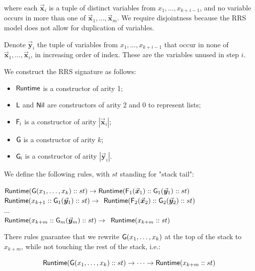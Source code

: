 \documentclass[11pt]{article}
\begin{document}
\noindent where each $\vec{\bm{x}}_i$ is a tuple of distinct variables from
$x_1, \dots, x_{k+i-1}$, and no variable occurs in more than one of
$\vec{\bm{x}}_1, \dots, \vec{\bm{x}}_m$. We require disjointness because the
RRS model does not allow for duplication of variables.

Denote $\vec{\bm{y}}_i$ the tuple of variables from $x_1, \dots, x_{k+i-1}$
that occur in none of $\vec{\bm{x}}_1, \dots, \vec{\bm{x}}_i$, in increasing
order of index. These are the variables unused in step $i$.

We construct the RRS signature as follows:

\begin{itemize}
  \item $\mathsf{Runtime}$ is a constructor of arity 1;
  \item $\mathsf{L}$ and $\mathsf{Nil}$ are constructors of arity 2 and 0
  to represent lists;
  \item $\mathsf{F_i}$ is a constructor of arity $|\vec{\bm{x}}_i|$;
  \item $\mathsf{G}$ is a constructor of arity $k$;
  \item $\mathsf{G_i}$ is a constructor of arity $|\vec{\bm{y}}_i|$.
\end{itemize}

We define the following rules, with $st$ standing for "stack tail":

\begin{pseudo}
   $\mathsf{Runtime}(\mathsf{G}(x_1, \dots, x_k) :: st) \to 
    \mathsf{Runtime}(\mathsf{F}_1(\vec{\bm{x}}_1) :: \mathsf{G}_1(\vec{\bm{y}}_1) :: st)$ \\
   $\mathsf{Runtime}(x_{k+1} :: \mathsf{G}_1(\vec{\bm{y}}_1) :: st) \to {}$
    $\mathsf{Runtime}(\mathsf{F}_{2}(\vec{\bm{x}}_{2}) :: \mathsf{G}_{2}(\vec{\bm{y}}_{2}) :: st)$ \\
  ... \\
   $\mathsf{Runtime}(x_{k+m} :: \mathsf{G}_m(\vec{\bm{y}}_m) :: st) \to {}$
    $\mathsf{Runtime}(x_{k+m} :: st)$
\end{pseudo}

There rules guarantee that we rewrite $\mathsf{G}(x_1, \dots, x_k)$ at the
top of the stack to $x_{k+m}$, while not touching the rest of the stack, i.e.:

$$
\mathsf{Runtime}(\mathsf{G}(x_1, \dots, x_k) :: st) \to \dots \to \mathsf{Runtime}(x_{k+m} :: st)
$$
\end{document}
